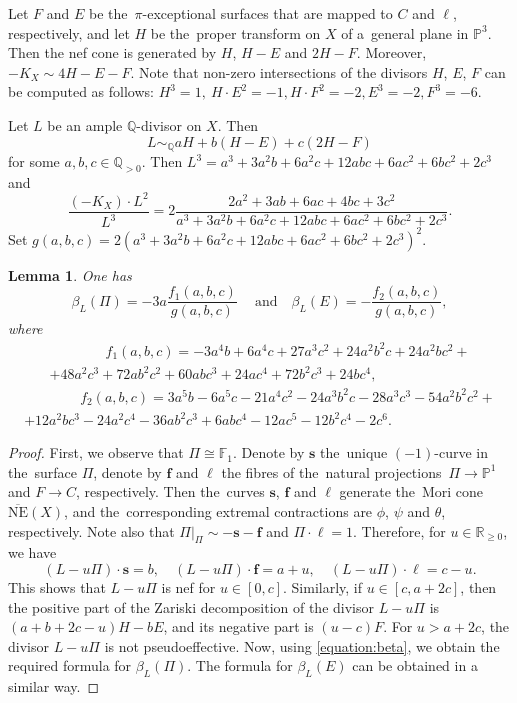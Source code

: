 \documentclass[12pt]{amsart}
\newtheorem{lemma}[theorem]{Lemma}
\theoremstyle{definition}
\theoremstyle{remark}
\begin{document}
Let $F$ and $E$ be the~$\pi$-exceptional surfaces that are mapped to $C$ and $\ell$, respectively, and let $H$ be the~proper transform on $X$ of a~general plane in $\mathbb{P}^3$.
Then the nef cone is generated by $H$, $H-E$ and $2H-F$. Moreover, $-K_X\sim 4H-E-F$.
Note that non-zero intersections of the divisors $H$, $E$, $F$ can be computed as follows:
$H^3=1,\ H\cdot E^2=-1, H\cdot F^2=-2, E^3=-2, F^3=-6$.

Let $L$ be an ample $\mathbb{Q}$-divisor on $X$. Then
$$
L\sim_{\mathbb{Q}} aH+b(H-E)+c(2H-F)
$$
for some $a,b,c\in\mathbb{Q}_{>0}$. Then $L^3=a^3+3a^2b+6a^2c+12abc+6ac^2+6bc^2+2c^3$
and
$$
\frac{(-K_X)\cdot L^{2}}{L^3}=2\frac{2a^2+3ab+6ac+4bc+3c^2}{a^3+3a^2b+6a^2c+12abc+6ac^2+6bc^2+2c^3}.
$$
Set $g(a,b,c)=2(a^3+3a^2b+6a^2c+12abc+6ac^2+6bc^2+2c^3)^2$.

\begin{lemma}
\label{lemma:3-18}
One has
$$
\beta_{L}(\Pi)=-3a\frac{f_1(a,b,c)}{g(a,b,c)}\ \quad \text{and}\quad \beta_{L}(E)=-\frac{f_2(a,b,c)}{g(a,b,c)},
$$
where
\begin{multline*}
\quad \quad \quad \quad f_1(a,b,c)=-3a^4b+6a^4c+27a^3c^2+24a^2b^2c+24a^2bc^2+\\
+48a^2c^3+72ab^2c^2+60abc^3+24ac^4+72b^2c^3+24bc^4, \quad \quad \quad \quad
\end{multline*}
\begin{multline*}
\quad \quad \quad \quad f_2(a,b,c)=3a^5b-6a^5c-21a^4c^2-24a^3b^2c-28a^3c^3-54a^2b^2c^2+\\
+12a^2bc^3-24a^2c^4-36ab^2c^3+6abc^4-12ac^5-12b^2c^4-2c^6.\quad \quad \quad \quad \quad \quad
\end{multline*}
\end{lemma}

\begin{proof}
First, we observe that $\Pi\cong\mathbb{F}_1$.
Denote by $\mathbf{s}$ the~unique $(-1)$-curve in the~surface $\Pi$, denote by $\mathbf{f}$ and $\ell$ the fibres of the~natural projections~\mbox{$\Pi\to\mathbb{P}^1$} and $F\to C$, respectively.
Then the~curves $\mathbf{s}$, $\mathbf{f}$ and $\ell$ generate the~Mori cone $\overline{\mathrm{NE}}(X)$,
and the~corresponding extremal contractions are $\phi$, $\psi$ and $\theta$, respectively.
Note also that $\Pi\vert_{\Pi}\sim-\mathbf{s}-\mathbf{f}$ and $\Pi\cdot\ell=1$.
Therefore, for $u\in\mathbb{R}_{\geqslant 0}$, we have
\[
(L-u\Pi)\cdot\mathbf{s}=b,\quad
(L-u\Pi)\cdot\mathbf{f}=a+u,\quad
(L-u\Pi)\cdot\ell=c-u.
\]
This shows that $L-u\Pi$ is nef for $u\in[0,c]$. Similarly, if $u\in[c,a+2c]$, then the positive part of the Zariski decomposition of the divisor $L-u\Pi$ is $(a+b+2c-u)H-bE$, and its negative part is $(u-c)F$. For $u>a+2c$, the divisor $L-u\Pi$ is not pseudoeffective. Now, using \eqref{equation:beta}, we obtain the required formula for $\beta_{L}(\Pi)$. The formula for $\beta_{L}(E)$ can be obtained in a similar way.
\end{proof}
\end{document}
